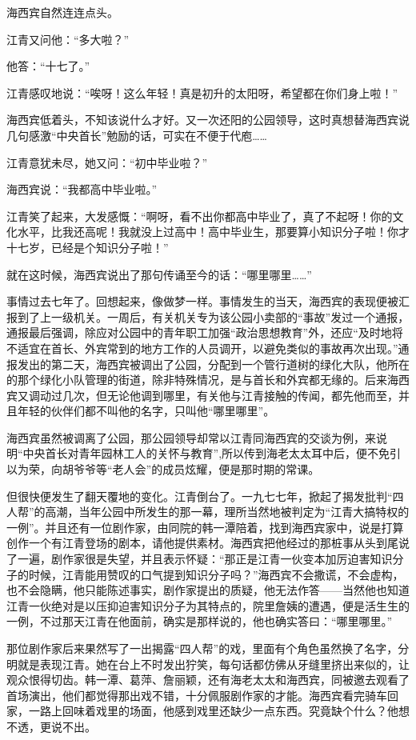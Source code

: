 \par 海西宾自然连连点头。
\par 江青又问他：“多大啦？”
\par 他答：“十七了。”
\par 江青感叹地说：“唉呀！这么年轻！真是初升的太阳呀，希望都在你们身上啦！”
\par 海西宾低着头，不知该说什么才好。又一次还阳的公园领导，这时真想替海西宾说几句感激“中央首长”勉励的话，可实在不便于代庖……
\par 江青意犹未尽，她又问：“初中毕业啦？”
\par 海西宾说：“我都高中毕业啦。”
\par 江青笑了起来，大发感慨：“啊呀，看不出你都高中毕业了，真了不起呀！你的文化水平，比我还高呢！我就没上过高中！高中毕业生，那要算小知识分子啦！你才十七岁，已经是个知识分子啦！”
\par 就在这时候，海西宾说出了那句传诵至今的话：“哪里哪里……”
\par 事情过去七年了。回想起来，像做梦一样。事情发生的当天，海西宾的表现便被汇报到了上一级机关。一周后，有关机关专为该公园小卖部的“事故”发过一个通报，通报最后强调，除应对公园中的青年职工加强“政治思想教育”外，还应“及时地将不适宜在首长、外宾常到的地方工作的人员调开，以避免类似的事故再次出现。”通报发出的第二天，海西宾被调出了公园，分配到一个管行道树的绿化大队，他所在的那个绿化小队管理的街道，除非特殊情况，是与首长和外宾都无缘的。后来海西宾又调动过几次，但无论他调到哪里，有关他与江青接触的传闻，都先他而至，并且年轻的伙伴们都不叫他的名字，只叫他“哪里哪里”。
\par 海西宾虽然被调离了公园，那公园领导却常以江青同海西宾的交谈为例，来说明“中央首长对青年园林工人的关怀与教育”,所以传到海老太太耳中后，便不免引以为荣，向胡爷爷等“老人会”的成员炫耀，便是那时期的常课。
\par 但很快便发生了翻天覆地的变化。江青倒台了。一九七七年，掀起了揭发批判“四人帮”的高潮，当年公园中所发生的那一幕，理所当然地被判定为“江青大搞特权的一例”。并且还有一位剧作家，由同院的韩一潭陪着，找到海西宾家中，说是打算创作一个有江青登场的剧本，请他提供素材。海西宾把他经过的那桩事从头到尾说了一遍，剧作家很是失望，并且表示怀疑：“那正是江青一伙变本加厉迫害知识分子的时候，江青能用赞叹的口气提到知识分子吗？”海西宾不会撒谎，不会虚构，也不会隐瞒，他只能陈述事实，剧作家提出的质疑，他无法作答——当然他也知道江青一伙绝对是以压抑迫害知识分子为其特点的，院里詹姨的遭遇，便是活生生的一例，不过那天江青在他面前，确实是那样说的，他也确实答曰：“哪里哪里。”
\par 那位剧作家后来果然写了一出揭露“四人帮”的戏，里面有个角色虽然换了名字，分明就是表现江青。她在台上不时发出狞笑，每句话都仿佛从牙缝里挤出来似的，让观众恨得切齿。韩一潭、葛萍、詹丽颖，还有海老太太和海西宾，同被邀去观看了首场演出，他们都觉得那出戏不错，十分佩服剧作家的才能。海西宾看完骑车回家，一路上回味着戏里的场面，他感到戏里还缺少一点东西。究竟缺个什么？他想不透，更说不出。
